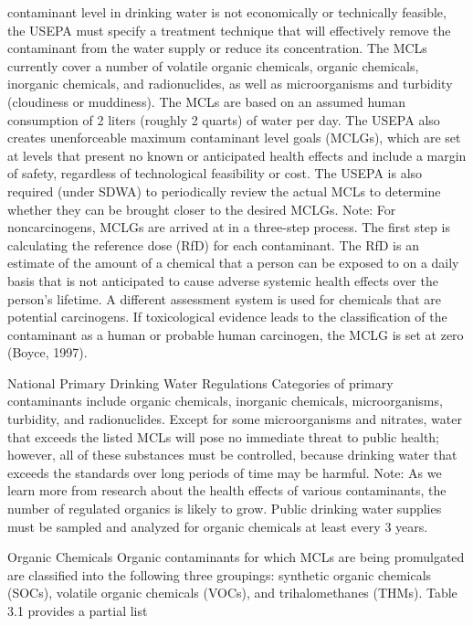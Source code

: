 \documentclass{article}
\begin{document}
\begin{enumerate}
  contaminant level in drinking water is not economically or technically
  feasible, the USEPA must specify a treatment technique that will
  effectively remove the contaminant from the water supply or reduce its
  concentration. The MCLs currently cover a number of volatile organic
  chemicals, organic chemicals, inorganic chemicals, and radionuclides,
  as well as microorganisms and turbidity (cloudiness or muddiness). The
  MCLs are based on an assumed human consumption of 2 liters (roughly 2
  quarts) of water per day. The USEPA also creates unenforceable maximum
  contaminant level goals (MCLGs), which are set at levels that present
  no known or anticipated health effects and include a margin of safety,
  regardless of technological feasibility or cost. The USEPA is also
  required (under SDWA) to periodically review the actual MCLs to
  determine whether they can be brought closer to the desired MCLGs.
  Note: For noncarcinogens, MCLGs are arrived at in a three-step
  process. The first step is calculating the reference dose (RfD) for
  each contaminant. The RfD is an estimate of the amount of a chemical
  that a person can be exposed to on a daily basis that is not
  anticipated to cause adverse systemic health effects over the person's
  lifetime. A different assessment system is used for chemicals that are
  potential carcinogens. If toxicological evidence leads to the
  classification of the contaminant as a human or probable human
  carcinogen, the MCLG is set at zero (Boyce, 1997).
\end{enumerate}

National Primary Drinking Water Regulations Categories of primary
contaminants include organic chemicals, inorganic chemicals,
microorganisms, turbidity, and radionuclides. Except for some
microorganisms and nitrates, water that exceeds the listed MCLs will
pose no immediate threat to public health; however, all of these
substances must be controlled, because drinking water that exceeds the
standards over long periods of time may be harmful. Note: As we learn
more from research about the health effects of various contaminants, the
number of regulated organics is likely to grow. Public drinking water
supplies must be sampled and analyzed for organic chemicals at least
every 3 years.

Organic Chemicals Organic contaminants for which MCLs are being
promulgated are classified into the following three groupings: synthetic
organic chemicals (SOCs), volatile organic chemicals (VOCs), and
trihalomethanes (THMs). Table 3.1 provides a partial list
\end{document}
